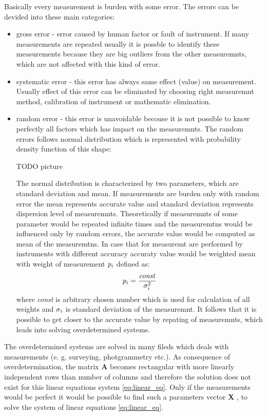 \documentclass[a4paper,12pt]{report}
\newcommand{\ematr}[1]{
{\bf #1}
}
\newcommand{\evect}[1]{
{\bf #1}
}
\newcommand{\escal}[1]{
{\it #1}
}
\begin{document}
Basically every measurement is burden with some error. The errors can be devided into these main categories:  
\begin{itemize}
\item gross error - error caused by human factor or fault of instrument. If many measurements are repeated
usually it is possble to identify these measurements because they are big outliers from the other measuremnts, which are not affected with this 
kind of error.
\item systematic error - this error has always same effect (value) on measurement.  Usually effect of this error can be 
eliminated by choosing right measuremnt method, calibration of instrument or mathematic elimination.
\item random error - this error is unavoidable becouse it is not possible to know perfectly all factors which has impact 
on the measuremnts. The random errors follows normal distribution which is represented with probability density function of this shape:

TODO picture


The normal distribution is characterized by two parameters, which are standard deviation and  mean. 
If measurements are burden only with random error the mean represents accurate value and standard deviation represents 
dispersion level of measuremnts. 
Theoretically  if measuremnts of some parameter would be repeated infinite times and the measuremtns would be influenced only by random errors,
the accurate value would be computed as  mean of the measuremtns. In case that for measuremt are performed by instruments with different accuracy
 accuraty value would be weighted mean with weight of measurement $\escal{p}_{i}$ defined as:
\begin{equation}
\escal{p}_{i} = \frac{\escal{const}}{\escal{\sigma}_{i}^{2}}
\end{equation} 
where \escal{const} is arbitrary chosen number which is used for calculation of all weights and $\escal{\sigma_{i}}$ is standard deviation of the measuremnt.
It follows that it is possible to get closer to the accurate value by repating of measuremnts, which 
leads into solving overdetermined systems. 

\end{itemize}

The overdetermined systems are solved in many fileds which deals with measurements (e. g. 
surveying, photgrammetry etc.).
As consequence of overdetermination, the matrix \ematr{A} becomes rectangular with more linearly independent rows than  number of columns 
and therefore the solution does not exist for this linear equations system \eqref{eq:linear_eq}.
Only if the measurements would be perfect it would be possible to find such a parameters vector \evect{X}, to 
solve the system of linear equations \eqref{eq:linear_eq}. 
\end{document}
